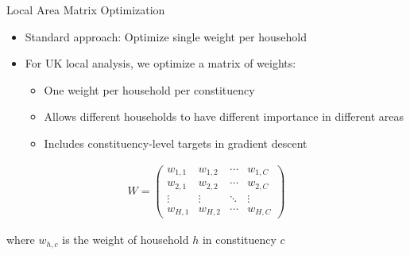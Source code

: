 \documentclass{beamer}
\begin{document}
\begin{frame}{Local Area Matrix Optimization}
    \begin{itemize}
        \item Standard approach: Optimize single weight per household
        \item For UK local analysis, we optimize a matrix of weights:
        \begin{itemize}
            \item One weight per household per constituency
            \item Allows different households to have different importance in different areas
            \item Includes constituency-level targets in gradient descent
        \end{itemize}
    \end{itemize}
    
    \begin{align*}
    W = \begin{pmatrix}
    w_{1,1} & w_{1,2} & \cdots & w_{1,C} \\
    w_{2,1} & w_{2,2} & \cdots & w_{2,C} \\
    \vdots & \vdots & \ddots & \vdots \\
    w_{H,1} & w_{H,2} & \cdots & w_{H,C}
    \end{pmatrix}
    \end{align*}

    where $w_{h,c}$ is the weight of household $h$ in constituency $c$
\end{frame}
\end{document}

